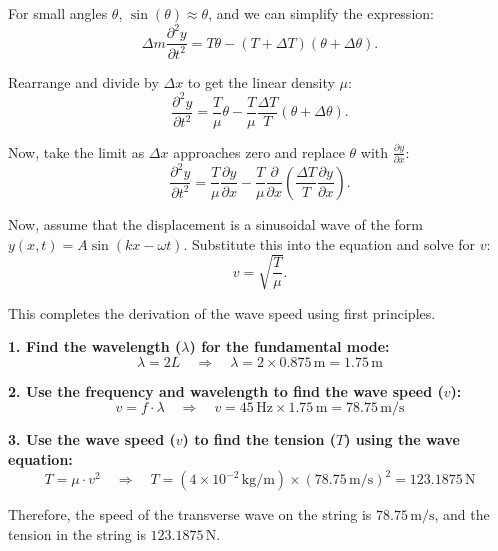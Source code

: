 \documentclass[journal,12pt,onecolumn]{IEEEtran}
\begin{document}
For small angles $\theta$, $\sin(\theta) \approx \theta$, and we can simplify the expression:
\begin{equation}\label{eq:simplified}
    \Delta m \frac{\partial^2y}{\partial t^2} = T \theta - (T + \Delta T)(\theta + \Delta \theta).
\end{equation}

Rearrange and divide by $\Delta x$ to get the linear density $\mu$:
\begin{equation}\label{eq:linear_density}
    \frac{\partial^2y}{\partial t^2} = \frac{T}{\mu} \theta - \frac{T}{\mu} \frac{\Delta T}{T}(\theta + \Delta \theta).
\end{equation}

Now, take the limit as $\Delta x$ approaches zero and replace $\theta$ with $\frac{\partial y}{\partial x}$:
\begin{equation}\label{eq:limit}
    \frac{\partial^2y}{\partial t^2} = \frac{T}{\mu} \frac{\partial y}{\partial x} - \frac{T}{\mu} \frac{\partial}{\partial x} \left(\frac{\Delta T}{T}\frac{\partial y}{\partial x}\right).
\end{equation}

Now, assume that the displacement is a sinusoidal wave of the form $y(x, t) = A \sin(kx - \omega t)$. Substitute this into the equation and solve for $v$:
\begin{equation}\label{eq:wave_speed}
    v = \sqrt{\frac{T}{\mu}}.
\end{equation}

This completes the derivation of the wave speed using first principles.

\textbf{1. Find the wavelength (\(\lambda\)) for the fundamental mode:}
\begin{equation}\label{eq:wavelength}
    \lambda = 2L \quad \Rightarrow \quad \lambda = 2 \times 0.875 \, \text{m} = 1.75 \, \text{m}
\end{equation}

\textbf{2. Use the frequency and wavelength to find the wave speed (\(v\)):}
\begin{equation}\label{eq:wavespeed}
    v = f \cdot \lambda \quad \Rightarrow \quad v = 45 \, \text{Hz} \times 1.75 \, \text{m} = 78.75 \, \text{m/s}
\end{equation}


\textbf{3. Use the wave speed (\(v\)) to find the tension (\(T\)) using the wave equation:}
\begin{equation}\label{eq:tension}
    T = \mu \cdot v^2 \quad \Rightarrow \quad T = (4 \times 10^{-2} \, \text{kg/m}) \times (78.75 \, \text{m/s})^2 = 123.1875 \, \text{N}
\end{equation}

Therefore, the speed of the transverse wave on the string is $78.75 \, \text{m/s}$, and the tension in the string is $123.1875 \, \text{N}$.
\end{document}
